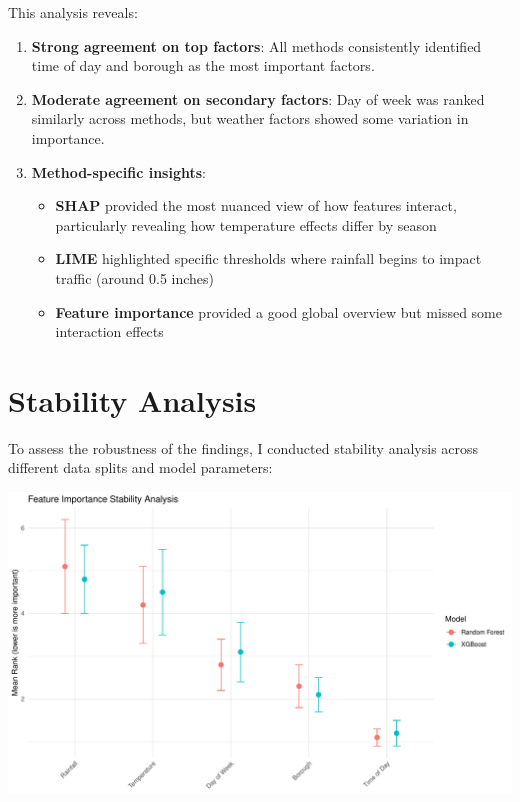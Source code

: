 \documentclass[
  letterpaper,
  DIV=11,
  numbers=noendperiod]{scrreprt}
\providecommand{\tightlist}{%
  \setlength{\itemsep}{0pt}\setlength{\parskip}{0pt}}\usepackage{longtable,booktabs,array}
\begin{document}
This analysis reveals:

\begin{enumerate}
\def\labelenumi{\arabic{enumi}.}
\item
  \textbf{Strong agreement on top factors}: All methods consistently
  identified time of day and borough as the most important factors.
\item
  \textbf{Moderate agreement on secondary factors}: Day of week was
  ranked similarly across methods, but weather factors showed some
  variation in importance.
\item
  \textbf{Method-specific insights}:

  \begin{itemize}
  \tightlist
  \item
    \textbf{SHAP} provided the most nuanced view of how features
    interact, particularly revealing how temperature effects differ by
    season
  \item
    \textbf{LIME} highlighted specific thresholds where rainfall begins
    to impact traffic (around 0.5 inches)
  \item
    \textbf{Feature importance} provided a good global overview but
    missed some interaction effects
  \end{itemize}
\end{enumerate}

\section{Stability Analysis}\label{stability-analysis-1}

To assess the robustness of the findings, I conducted stability analysis
across different data splits and model parameters:

\includegraphics[width=1\textwidth,height=\textheight]{figures/stability-analysis-1.pdf}
\end{document}
